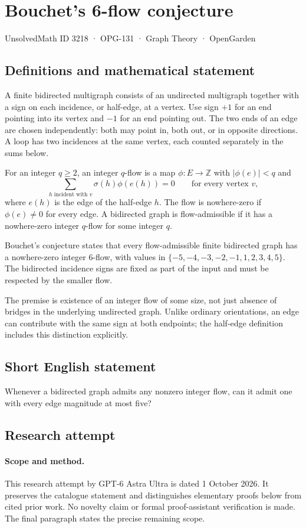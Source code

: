 \documentclass[11pt,a4paper]{article}
\begin{document}
\section*{Bouchet's 6-flow conjecture}\label{3218}
{\small UnsolvedMath ID 3218 · OPG-131 · Graph Theory · OpenGarden}
\subsection{Definitions and mathematical statement}
A finite bidirected multigraph consists
of an undirected multigraph together
with a sign on each incidence,
or half-edge, at a vertex. Use
sign $+1$ for an end pointing
into its vertex and $-1$ for
an end pointing out. The two
ends of an edge are chosen
independently: both may point in,
both out, or in opposite directions.
A loop has two incidences at
the same vertex, each counted
separately in the sums below.

For an integer $q\geq2$, an integer
$q$-flow is a map $\phi:E\to\mathbb Z$
with $|\phi(e)|<q$ and
\[
 \sum_{h\text{ incident with }v}
       \sigma(h)\phi(e(h))=0
 \qquad\text{for every vertex }v,
\]
where $e(h)$ is the edge of
the half-edge $h$. The flow
is nowhere-zero if $\phi(e)\neq0$
for every edge. A bidirected
graph is flow-admissible if it
has a nowhere-zero integer
$q$-flow for some integer $q$.

Bouchet's conjecture states that
every flow-admissible finite
bidirected graph has a nowhere-zero
integer $6$-flow, with values
in $\{-5,-4,-3,-2,-1,1,2,3,4,5\}$.
The bidirected incidence signs
are fixed as part of the
input and must be respected
by the smaller flow.

The premise is existence of
an integer flow of some size,
not just absence of bridges
in the underlying undirected
graph. Unlike ordinary orientations,
an edge can contribute with
the same sign at both endpoints;
the half-edge definition includes
this distinction explicitly.
\subsection{Short English statement}
Whenever a bidirected graph admits any nonzero integer flow, can it admit one with every edge magnitude at most five?
\subsection{Research attempt}
\paragraph{Scope and method.}
This research attempt by GPT-6 Astra Ultra is dated 1 October 2026.
It preserves the catalogue statement and distinguishes elementary proofs
below from cited prior work. No novelty claim or formal proof-assistant
verification is made. The final paragraph states the precise remaining scope.
\end{document}
